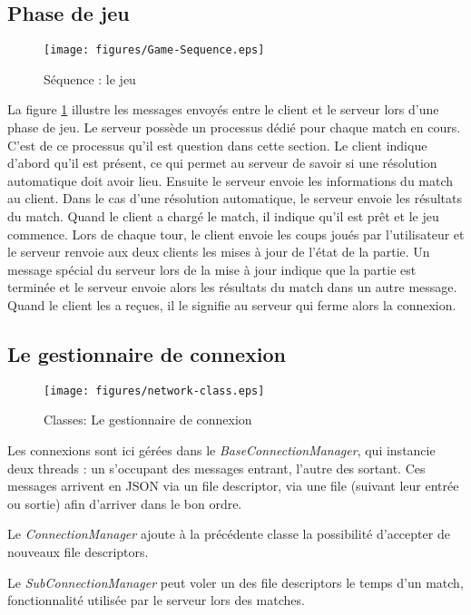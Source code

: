\subsection{Phase de jeu}
\begin{figure}[h!]
  \centering
  \texttt{[image: figures/Game-Sequence.eps]}
  \caption{\label{fig:Sequence:Game} Séquence : le jeu}
\end{figure}
La figure \ref{fig:Sequence:Game} illustre les messages envoyés entre le \gls{client} et le \gls{serveur} 
lors d'une phase de jeu. 
Le serveur possède un processus dédié pour chaque match en cours. C'est de 
ce processus qu'il est question dans cette section.
Le client indique d'abord qu'il est présent, ce qui permet au serveur de 
savoir si une résolution automatique doit avoir lieu. 
Ensuite le serveur envoie les informations du match au client. Dans le cas 
d'une résolution automatique, le serveur envoie les résultats du match.
Quand le client a chargé le match, il indique qu'il est prêt et le jeu commence.
Lors de chaque tour, le client envoie les coups joués par l'utilisateur et le 
serveur renvoie aux deux clients les mises à jour de l'état de la partie.
Un message spécial du serveur lors de la mise à jour indique que la partie
est terminée et le serveur envoie alors les résultats du match dans un autre 
message. Quand le client les a reçues, il le signifie au serveur qui ferme 
alors la connexion.

\subsection{Le gestionnaire de connexion}
\begin{figure}[h!]
  \centering
  \texttt{[image: figures/network-class.eps]}
  \caption{\label{fig:Class:Network} Classes: Le gestionnaire de connexion}
\end{figure}

Les connexions sont ici gérées dans le \emph{BaseConnectionManager}, qui instancie deux threads : un s'occupant des messages entrant, l'autre des sortant. Ces messages arrivent en JSON via un file descriptor, via une file (suivant leur entrée ou sortie) afin d'arriver dans le bon ordre.

Le \emph{ConnectionManager} ajoute à la précédente classe la possibilité d'accepter de nouveaux file descriptors.

Le \emph{SubConnectionManager} peut voler un des file descriptors le temps d'un match, fonctionnalité utilisée par le serveur lors des matches.



